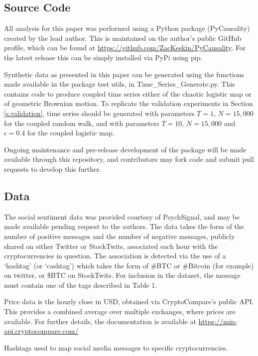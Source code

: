 \documentclass[]{rsos}%
\begin{document}
{  \subsection{Source Code}
    All analysis for this paper was performed using a Python package (PyCausality) created by the lead author. This is maintained on the author's public GitHub profile, which can be found at \url{https://github.com/ZacKeskin/PyCausality}. For the latest release this can be simply installed via PyPi using pip. 

    Synthetic data as presented in this paper can be generated using the functions made available in the package test utils, in Time\_Series\_Generate.py. This contains code to produce coupled time series either of the chaotic logistic map or of geometric Brownian motion. To replicate the validation experiments in Section \ref{s.validation}, time series should be generated with parameters $T=1$, $N=15,000$ for the coupled random walk, and with parameters $T=10$, $N=15,000$ and $\epsilon=0.4$ for the coupled logistic map. 

    Ongoing maintenance and pre-release development of the package will be made available through this repository, and contributors may fork code and submit pull requests to develop this further.


  \subsection{Data} \label{a.data}

  The social sentiment data was provided courtesy of PsychSignal, and may be made available pending request to the authors. The data takes the form of the number of positive messages and the number of negative messages, publicly shared on either Twitter or StockTwits, associated each hour with the cryptocurrencies in question. The association is detected via the use of a `hashtag' (or `cashtag') which takes the form of \#BTC or \#Bitcoin (for example) on twitter, or \$BTC on StockTwits.  For inclusion in the dataset, the message must contain one of the tags described in Table {\color{blue}1}.  
  
  Price data is the hourly close in USD, obtained via CryptoCompare's public API. This provides a combined average over multiple exchanges, where prices are available. For further details, the documentation is available at \url{https://min-api.cryptocompare.com/}

  \begin{table}[!htb]
    \label{t.table1}
    \caption{\label{tab:table1} Hashtags used to map social media messages to specific cryptocurrencies.}
    

\end{table}}
\end{document}
